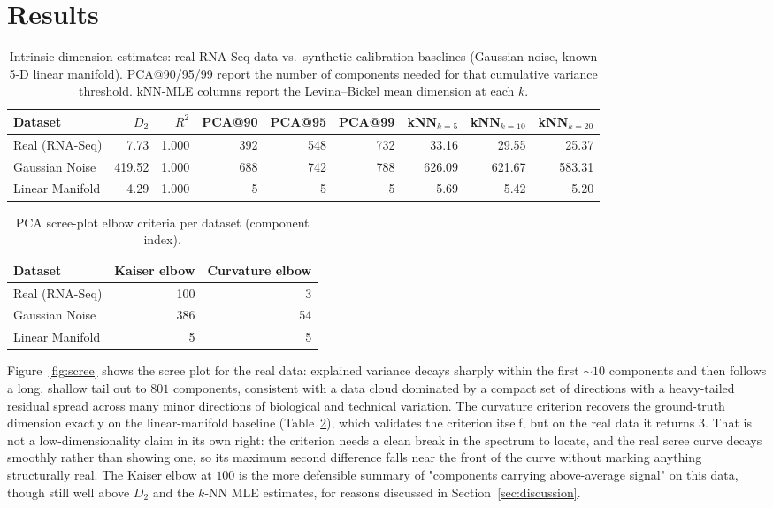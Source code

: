 \documentclass[11pt]{article}
\begin{document}
\section{Results}
\label{sec:results}

\begin{table}[H]
\centering
\caption{Intrinsic dimension estimates: real RNA-Seq data vs.\ synthetic
calibration baselines (Gaussian noise, known 5-D linear manifold). PCA@90/95/99
report the number of components needed for that cumulative variance
threshold. kNN-MLE columns report the Levina--Bickel mean dimension at each
$k$.}
\label{tab:summary}
\begin{tabular}{lrrrrrrrr}
\toprule
Dataset & $D_2$ & $R^2$ & PCA@90 & PCA@95 & PCA@99 & kNN$_{k=5}$ & kNN$_{k=10}$ & kNN$_{k=20}$ \\
\midrule
Real (RNA-Seq)   & 7.73   & 1.000 & 392 & 548 & 732 & 33.16  & 29.55  & 25.37 \\
Gaussian Noise   & 419.52 & 1.000 & 688 & 742 & 788 & 626.09 & 621.67 & 583.31 \\
Linear Manifold  & 4.29   & 1.000 & 5   & 5   & 5   & 5.69   & 5.42   & 5.20 \\
\bottomrule
\end{tabular}
\end{table}

\begin{table}[H]
\centering
\caption{PCA scree-plot elbow criteria per dataset (component index).}
\label{tab:elbow}
\begin{tabular}{lrr}
\toprule
Dataset & Kaiser elbow & Curvature elbow \\
\midrule
Real (RNA-Seq)   & 100 & 3 \\
Gaussian Noise   & 386 & 54 \\
Linear Manifold  & 5   & 5 \\
\bottomrule
\end{tabular}
\end{table}

Figure~\ref{fig:scree} shows the scree plot for the real data: explained
variance decays sharply within the first $\sim 10$ components and then
follows a long, shallow tail out to $801$ components, consistent with a
data cloud dominated by a compact set of directions with a heavy-tailed
residual spread across many minor directions of biological and technical
variation. The curvature criterion recovers the ground-truth dimension exactly on
the linear-manifold baseline (Table~\ref{tab:elbow}), which validates the
criterion itself, but on the real data it returns $3$. That is not a
low-dimensionality claim in its own right: the criterion needs a clean
break in the spectrum to locate, and the real scree curve decays
smoothly rather than showing one, so its maximum second difference falls
near the front of the curve without marking anything structurally real.
The Kaiser elbow at $100$ is the more defensible summary of "components
carrying above-average signal" on this data, though still well above
$D_2$ and the $k$-NN MLE estimates, for reasons discussed in
Section~\ref{sec:discussion}.
\end{document}
